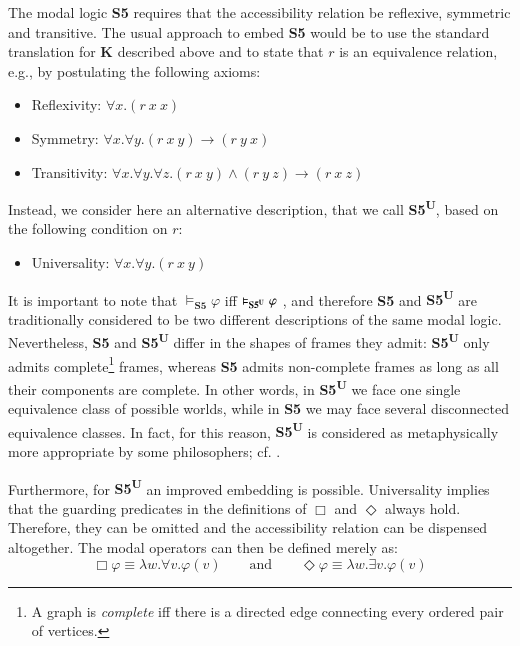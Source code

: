 \documentclass{article}
\newcommand{\logic}[1]{\textbf{#1}\xspace}
\newcommand{\SFive}{\logic{S5}}
\newcommand{\SFiveU}{\logic{S5\textsuperscript{U}}}
\newcommand{\Dia}{\Diamond} %
\newcommand{\BlackBox}{\blacksquare}
\newcommand{\BlackDia}{\Diamondblack}
\begin{document}
The modal logic \SFive requires that the accessibility relation be
reflexive, symmetric and transitive. The usual approach to embed
\SFive would be to use the standard translation for \textbf{K} described above
and to state that $r$ is an equivalence relation, e.g., by postulating
the following axioms:
\begin{itemize}
\item Reflexivity: $\forall x. (r~x~x)$
\item Symmetry: $\forall x. \forall y. (r~x~y) \rightarrow (r~y~x)$ 
\item Transitivity: $\forall x. \forall y. \forall z. (r~x~y) \wedge (r~y~z) \rightarrow (r~x~z)$
\end{itemize}
Instead, we consider here an alternative description, that we call \SFiveU, based on the following condition on $r$:
\begin{itemize}
\item Universality: $\forall x. \forall y. (r~x~y)$
\end{itemize}

It is important to note that $\vDash_{\SFive} \varphi$ iff $\vDash_{\SFiveU} \varphi$ 
\cite{Blackburn}, and therefore \SFive and \SFiveU are traditionally considered to be 
two different descriptions of the same modal logic. Nevertheless, \SFive and \SFiveU 
differ in the shapes of frames they admit:
\SFiveU only admits
complete\footnote{A graph is \emph{complete} iff there is a directed
  edge connecting every ordered pair of vertices.} frames, whereas
\SFive admits non-complete frames as long as all their components are
complete. In other words, in \SFiveU we face one single equivalence
class of possible worlds, while in \SFive we may face several
disconnected equivalence classes. In fact, for this reason, \SFiveU is
considered as metaphysically more appropriate by some philosophers;
cf. \cite[p.~127]{williamson13}.

Furthermore, for \SFiveU an improved embedding is possible. Universality implies
that the guarding predicates in the definitions of $\Box$ and
$\Diamond$ always hold. Therefore, they can be omitted and the
accessibility relation can be dispensed altogether. The modal
operators can then be defined merely as:
\[\Box \varphi \equiv \lambda w. \forall v.  \varphi(v) \qquad \text{and}
\qquad \Dia \varphi \equiv \lambda w.\exists v. \varphi(v)\]
\end{document}
